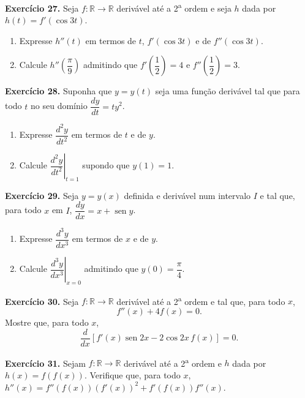 \documentclass[12pt,a4paper]{article}
\begin{document}
\vspace{0.5cm}
\noindent\textbf{Exercício 27.} Seja $f\colon \mathbb{R} \to \mathbb{R}$ derivável até a 2\textsuperscript{a} ordem e seja $h$ dada por $h(t) = f'(\cos 3t)$.
\begin{enumerate}
    \renewcommand{\theenumi}{\alph{enumi}}
    \renewcommand{\labelenumi}{\theenumi)}
    \item Expresse $h''(t)$ em termos de $t$, $f'(\cos 3t)$ e de $f''(\cos 3t)$.
    \item Calcule $h''\!\left(\dfrac{\pi}{9}\right)$ admitindo que $f'\!\left(\dfrac{1}{2}\right) = 4$ e $f''\!\left(\dfrac{1}{2}\right) = 3$.
\end{enumerate}

\vspace{0.5cm}
\noindent\textbf{Exercício 28.} Suponha que $y = y(t)$ seja uma função derivável tal que para todo $t$ no seu domínio $\dfrac{dy}{dt} = ty^2$.
\begin{enumerate}
    \renewcommand{\theenumi}{\alph{enumi}}
    \renewcommand{\labelenumi}{\theenumi)}
    \item Expresse $\dfrac{d^2 y}{dt^2}$ em termos de $t$ e de $y$.
    \item Calcule $\left.\dfrac{d^2 y}{dt^2}\right|_{t = 1}$ supondo que $y(1) = 1$.
\end{enumerate}

\vspace{0.5cm}
\noindent\textbf{Exercício 29.} Seja $y = y(x)$ definida e derivável num intervalo $I$ e tal que, para todo $x$ em $I$, $\dfrac{dy}{dx} = x + \operatorname{sen} y$.
\begin{enumerate}
    \renewcommand{\theenumi}{\alph{enumi}}
    \renewcommand{\labelenumi}{\theenumi)}
    \item Expresse $\dfrac{d^3 y}{dx^3}$ em termos de $x$ e de $y$.
    \item Calcule $\left.\dfrac{d^3 y}{dx^3}\right|_{x = 0}$ admitindo que $y(0) = \dfrac{\pi}{4}$.
\end{enumerate}

\vspace{0.5cm}
\noindent\textbf{Exercício 30.}
Seja $f\colon \mathbb{R} \to \mathbb{R}$ derivável até a 2\textsuperscript{a} ordem e tal que, para todo $x$,
\[
f''(x) + 4f(x) = 0.
\]
Mostre que, para todo $x$,
\[
\dfrac{d}{dx}[f'(x)\operatorname{sen} 2x - 2\cos 2x\,f(x)] = 0.
\]

\vspace{0.5cm}
\noindent\textbf{Exercício 31.}
Sejam $f\colon \mathbb{R} \to \mathbb{R}$ derivável até a 2\textsuperscript{a} ordem e $h$ dada por $h(x) = f(f(x))$. Verifique que, para todo $x$, $h''(x) = f''(f(x))(f'(x))^2 + f'(f(x))f''(x)$.
\end{document}
